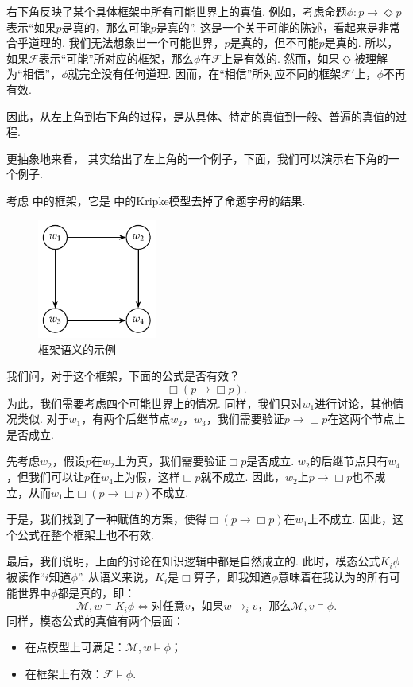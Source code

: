 右下角反映了某个具体框架中所有可能世界上的真值. 例如，考虑命题$\phi:p \to\Diamond p$表示“如果$p$是真的，那么可能$p$是真的”. 这是一个关于可能的陈述，看起来是非常合乎道理的. 我们无法想象出一个可能世界，$p$是真的，但不可能$p$是真的. 所以，如果$\mathcal{F}$表示“可能”所对应的框架，那么$\phi$在$\mathcal{F}$上是有效的. 然而，如果$\Diamond$被理解为“相信”，$\phi$就完全没有任何道理. 因而，在“相信”所对应不同的框架$\mathcal{F}'$上，$\phi$不再有效.

因此，从左上角到右下角的过程，是从具体、特定的真值到一般、普遍的真值的过程.

更抽象地来看， 其实给出了左上角的一个例子，下面，我们可以演示右下角的一个例子. 

\begin{example}\label{ex:modal-logic-frame-validity}
考虑 中的框架，它是 中的Kripke模型去掉了命题字母的结果. 
\begin{figure}[ht]
\centering
\includegraphics[width=0.35\textwidth]{figures/modal-logic/frame-validity.pdf}
\caption{框架语义的示例} \label{fig:frame-validity}
\end{figure}

我们问，对于这个框架，下面的公式是否有效？
\[\Box (p\to\Box p).\]
为此，我们需要考虑四个可能世界上的情况. 同样，我们只对$w_1$进行讨论，其他情况类似. 对于$w_1$，有两个后继节点$w_2$，$w_3$，我们需要验证$p\to\Box p$在这两个节点上是否成立. 

先考虑$w_2$，假设$p$在$w_2$上为真，我们需要验证$\Box p$是否成立. $w_2$的后继节点只有$w_4$，但我们可以让$p$在$w_4$上为假，这样$\Box p$就不成立. 因此，$w_2$上$p\to\Box p$也不成立，从而$w_1$上$\Box (p\to\Box p)$不成立. 

于是，我们找到了一种赋值的方案，使得$\Box (p\to\Box p)$在$w_1$上不成立. 因此，这个公式在整个框架上也不有效. 
\end{example}


最后，我们说明，上面的讨论在知识逻辑中都是自然成立的. 此时，模态公式$K_i\phi$被读作“$i$知道$\phi$”. 从语义来说，$K_i$是$\Box$算子，即我知道$\phi$意味着在我认为的所有可能世界中$\phi$都是真的，即：
\[
\mathcal M,w\vDash K_i\phi\Longleftrightarrow\text{对任意$v$，如果$w\to_i v$，那么$\mathcal M,v\vDash\phi$}. 
\]
同样，模态公式的真值有两个层面：
\begin{itemize}
\item 在点模型上可满足：$\mathcal M,w\vDash\phi$；
\item 在框架上有效：$\mathcal F\vDash\phi$. 
\end{itemize}

